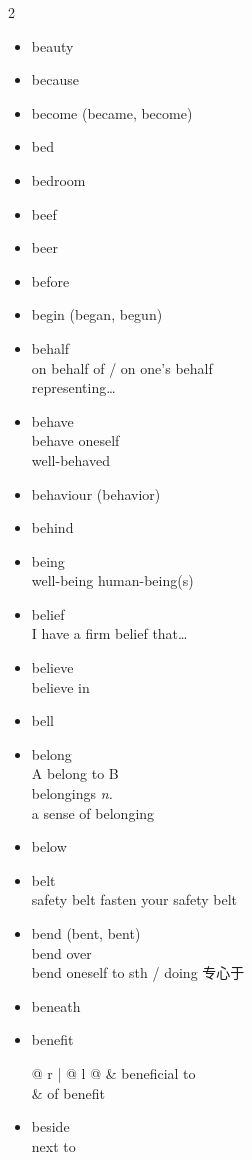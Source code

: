 \documentclass[../../book.tex]{subfiles}
\begin{document}
\begin{multicols}{2}
\begin{itemize}
\item[-] beauty
\item[-] because
\item[-] become (became, become)
\item[-] bed
\item[-] bedroom
\item[-] beef
\item[-] beer
\item[-] before
\item[-] begin (began, begun)
\item[-] behalf
\\on behalf of / on one\textquoteright s behalf
\\representing\ldots
\item[-] behave
\\behave oneself
\\well-behaved
\item[-] behaviour (behavior)
\item[-] behind
\item[-] being
\\well-being human-being(s)
\item[-] belief
\\I have a firm belief that\ldots
\item[-] believe
\\believe in
\item[-] bell
\item[-] belong
\\A belong to B
\\belongings \emph{n.}
\\a sense of belonging
\item[-] below
\item[-] belt
\\safety belt \phantom{a} fasten your safety belt
\item[-] bend (bent, bent)
\\bend over
\\bend oneself to sth / doing 专心于
\item[-] beneath
\item[-] benefit
\\\begin{tabular}{@{} r | @{\hspace{0.1em}} l @{}}
 & beneficial to
\\& of benefit
\end{tabular}
\item[-] beside
\\next to

\end{itemize}
\end{multicols}
\end{document}
